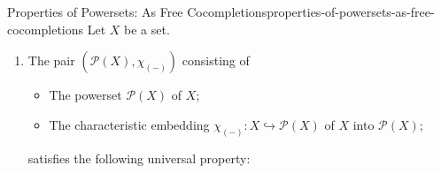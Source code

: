 \begin{proposition}{Properties of Powersets: As Free Cocompletions}{properties-of-powersets-as-free-cocompletions}%
    Let $X$ be a set.
    \begin{enumerate}
        \item\label{properties-of-powersets-as-free-cocompletions-universal-property}The pair $(\mathcal{P}(X),\chi_{(-)})$ consisting of
            \begin{itemize}
                \item The powerset $\mathcal{P}(X)$ of $X$;
                \item The characteristic embedding $\chi_{(-)}\colon X\hookrightarrow\mathcal{P}(X)$ of $X$ into $\mathcal{P}(X)$;
            \end{itemize}
            satisfies the following universal property:


\end{enumerate}
\end{proposition}
